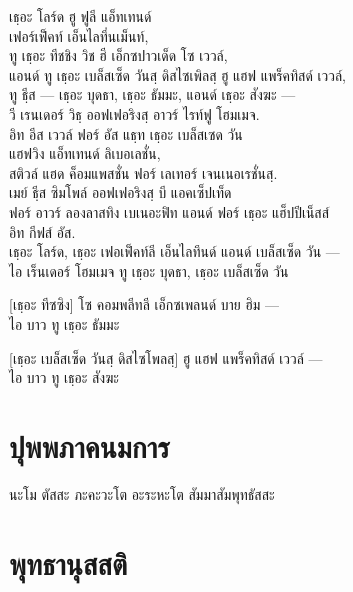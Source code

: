 \begin{thaitrans}
 เธฺอะ โลร์ด ฮู ฟูลี แอ็ทเทนด์\\
\vin เฟอร์เฟ็คท์ เอ็นไลทึ่นเม็นท์,\\
ทู เธฺอะ ทีชชิง วิช ฮี เอ็กซปาวเด็ด โซ เววล์,\\
แอนด์ ทู เธฺอะ เบล็สเซ็ด วันสฺ ดิสไซเพิลสฺ ฮู แฮฟ แพร็คทิสด์ เววล์,\\
ทู ธีฺส — เธฺอะ บุดธา, เธฺอะ ธัมมะ, แอนด์ เธฺอะ สังฆะ —\\
วี เรนเดอร์ วิธฺ ออฟเฟอริงสฺ อาวร์ ไรท์ฟู โฮมเมจ.\\
อิท อีส เววล์ ฟอร์ อัส แธฺท เธฺอะ เบล็สเซด วัน\\
\vin แฮฟวิง แอ็ทเทนด์ ลิเบอเลชั่น,\\
สติวล์ แฮด ค็อมแพสชั่น ฟอร์ เลเทอร์ เจนเนอเรชั่นสฺ.\\
เมย์ ธีฺส ซิมโพล์ ออฟเฟอริงสฺ บี แอคเซ็ปเท็ด\\
ฟอร์ อาวร์ ลองลาสทิง เบเนอะฟิท แอนด์ ฟอร์ เธฺอะ แฮ็ปปีเน็สส์\\
\vin อิท กีฟส์ อัส.\\
เธฺอะ โลร์ด, เธฺอะ เฟอเฟ็คท์ลี เอ็นไลทึนด์ แอนด์ เบล็สเซ็ด วัน —\\
ไอ เร็นเดอร์ โฮมเมจ ทู เธฺอะ บุดธา, เธฺอะ เบล็สเซ็ด วัน

[เธฺอะ ทีซซิง] โซ คอมพลีทลี เอ็กซเพลนด์ บาย ฮิม —\\
ไอ บาว ทู เธฺอะ ธัมมะ

[เธฺอะ เบล็สเซ็ด วันสฺ ดิสไซโพลสฺ] ฮู แฮฟ แพร็คทิสด์ เววล์ —\\
ไอ บาว ทู เธฺอะ สังฆะ
\end{thaitrans}
\clearpage

\chapter*{ปุพพภาคนมการ}
\delegateSetUseNext

\begin{leader}
\end{leader}

นะโม ตัสสะ ภะคะวะโต อะระหะโต สัมมาสัมพุทธัสสะ\\

\chapter*{พุทธานุสสติ}
\delegateSetUseNext

